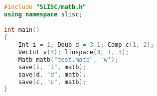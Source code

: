

\begin{lstlisting}[language=cpp]
#include "SLISC/matb.h"
using namespace slisc;

int main()
{
    Int i = 1; Doub d = 3.1; Comp c(1, 2);
    VecInt v(3); linspace(3, 1, 3);
    Matb matb("test.matb", 'w');
    save(i, "i", matb);
    save(d, "d", matb);
    save(c, "c", matb);
}
\end{lstlisting}
